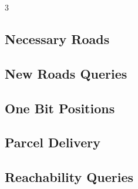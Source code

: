 \documentclass[8pt]{extarticle}
\begin{document}
\begin{multicols*}{3}
\subsection{Necessary Roads}
\begin{caixaenunciado}

\end{caixaenunciado}
\vspace{0.3cm}


\subsection{New Roads Queries}
\begin{caixaenunciado}

\end{caixaenunciado}
\vspace{0.3cm}


\subsection{One Bit Positions}
\begin{caixaenunciado}

\end{caixaenunciado}
\vspace{0.3cm}


\subsection{Parcel Delivery}
\begin{caixaenunciado}

\end{caixaenunciado}
\vspace{0.3cm}


\subsection{Reachability Queries}
\begin{caixaenunciado}

\end{caixaenunciado}
\vspace{0.3cm}



\end{multicols*}
\end{document}
